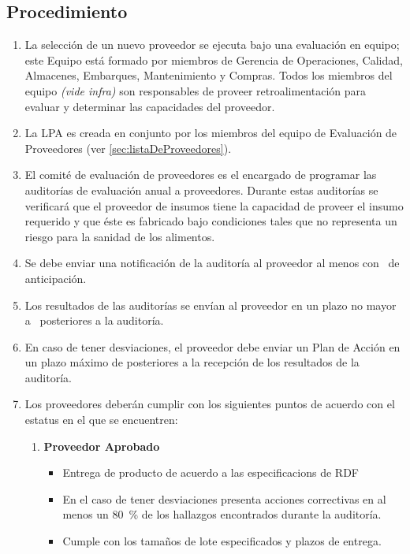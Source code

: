 \subsection{Procedimiento}
\begin{enumerate}
    \item La selección de un nuevo proveedor se ejecuta bajo una evaluación en equipo; este Equipo está formado por miembros de Gerencia de Operaciones, Calidad, Almacenes, Embarques, Mantenimiento y Compras. Todos los miembros del equipo \textit{(vide infra)} son responsables de proveer retroalimentación para evaluar y determinar las capacidades del proveedor.
    \item La \Gls{LPA} es creada en conjunto por los miembros del equipo de Evaluación de Proveedores (ver \cref{sec:listaDeProveedores}).
    \item El comité de evaluación de proveedores es el encargado de programar las auditorías de evaluación anual a proveedores. Durante estas auditorías se verificará que el proveedor de insumos tiene la capacidad de proveer el insumo requerido y que éste es fabricado bajo condiciones tales que no representa un riesgo para la sanidad de los alimentos.
    \item Se debe enviar una notificación de la auditoría al proveedor al menos con \NotifAuditoriaAProveedor~de anticipación.
    \item Los resultados de las auditorías se envían al proveedor en un plazo no mayor a \PlazoResultadoAProveedor~posteriores a la auditoría.
    \item En caso de tener desviaciones, el proveedor debe enviar un Plan de Acción en un plazo máximo de \PlazoPlanDeAccionAuditProveedor posteriores a la recepción de los resultados de la auditoría.
    \item Los proveedores deberán cumplir con los siguientes puntos de acuerdo con el estatus en el que se encuentren:
          \begin{enumerate}
              \item \textbf{Proveedor Aprobado}
                    \begin{itemize}
                        \item Entrega de producto de acuerdo a las \glspl{especificacion} de \gls{RDF}
                        \item En el caso de tener desviaciones presenta acciones correctivas en al menos un \qty{80}{\percent} de los hallazgos encontrados durante la auditoría.
                        \item Cumple con los tamaños de lote especificados y plazos de entrega.

\end{itemize}
\end{enumerate}
\end{enumerate}
